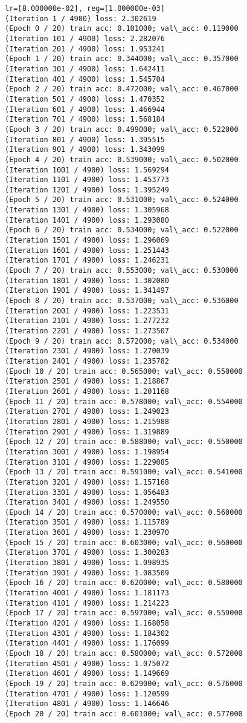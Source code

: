 \documentclass[11pt]{article}
\begin{document}
\begin{Verbatim}[commandchars=\\\{\}]
lr=[8.000000e-02], reg=[1.000000e-03]
(Iteration 1 / 4900) loss: 2.302619
(Epoch 0 / 20) train acc: 0.101000; val\_acc: 0.119000
(Iteration 101 / 4900) loss: 2.282076
(Iteration 201 / 4900) loss: 1.953241
(Epoch 1 / 20) train acc: 0.344000; val\_acc: 0.357000
(Iteration 301 / 4900) loss: 1.642411
(Iteration 401 / 4900) loss: 1.545704
(Epoch 2 / 20) train acc: 0.472000; val\_acc: 0.467000
(Iteration 501 / 4900) loss: 1.470352
(Iteration 601 / 4900) loss: 1.466944
(Iteration 701 / 4900) loss: 1.568184
(Epoch 3 / 20) train acc: 0.499000; val\_acc: 0.522000
(Iteration 801 / 4900) loss: 1.395515
(Iteration 901 / 4900) loss: 1.343099
(Epoch 4 / 20) train acc: 0.539000; val\_acc: 0.502000
(Iteration 1001 / 4900) loss: 1.569294
(Iteration 1101 / 4900) loss: 1.453773
(Iteration 1201 / 4900) loss: 1.395249
(Epoch 5 / 20) train acc: 0.531000; val\_acc: 0.524000
(Iteration 1301 / 4900) loss: 1.305968
(Iteration 1401 / 4900) loss: 1.293080
(Epoch 6 / 20) train acc: 0.534000; val\_acc: 0.522000
(Iteration 1501 / 4900) loss: 1.296069
(Iteration 1601 / 4900) loss: 1.251443
(Iteration 1701 / 4900) loss: 1.246231
(Epoch 7 / 20) train acc: 0.553000; val\_acc: 0.530000
(Iteration 1801 / 4900) loss: 1.302080
(Iteration 1901 / 4900) loss: 1.341497
(Epoch 8 / 20) train acc: 0.537000; val\_acc: 0.536000
(Iteration 2001 / 4900) loss: 1.223531
(Iteration 2101 / 4900) loss: 1.277232
(Iteration 2201 / 4900) loss: 1.273507
(Epoch 9 / 20) train acc: 0.572000; val\_acc: 0.534000
(Iteration 2301 / 4900) loss: 1.270039
(Iteration 2401 / 4900) loss: 1.235782
(Epoch 10 / 20) train acc: 0.565000; val\_acc: 0.550000
(Iteration 2501 / 4900) loss: 1.218867
(Iteration 2601 / 4900) loss: 1.201168
(Epoch 11 / 20) train acc: 0.578000; val\_acc: 0.554000
(Iteration 2701 / 4900) loss: 1.249023
(Iteration 2801 / 4900) loss: 1.215988
(Iteration 2901 / 4900) loss: 1.319889
(Epoch 12 / 20) train acc: 0.588000; val\_acc: 0.550000
(Iteration 3001 / 4900) loss: 1.198954
(Iteration 3101 / 4900) loss: 1.229085
(Epoch 13 / 20) train acc: 0.591000; val\_acc: 0.541000
(Iteration 3201 / 4900) loss: 1.157168
(Iteration 3301 / 4900) loss: 1.056483
(Iteration 3401 / 4900) loss: 1.249550
(Epoch 14 / 20) train acc: 0.570000; val\_acc: 0.560000
(Iteration 3501 / 4900) loss: 1.115789
(Iteration 3601 / 4900) loss: 1.230970
(Epoch 15 / 20) train acc: 0.603000; val\_acc: 0.560000
(Iteration 3701 / 4900) loss: 1.300283
(Iteration 3801 / 4900) loss: 1.098935
(Iteration 3901 / 4900) loss: 1.083509
(Epoch 16 / 20) train acc: 0.620000; val\_acc: 0.580000
(Iteration 4001 / 4900) loss: 1.181173
(Iteration 4101 / 4900) loss: 1.214223
(Epoch 17 / 20) train acc: 0.597000; val\_acc: 0.559000
(Iteration 4201 / 4900) loss: 1.168058
(Iteration 4301 / 4900) loss: 1.184302
(Iteration 4401 / 4900) loss: 1.176099
(Epoch 18 / 20) train acc: 0.580000; val\_acc: 0.572000
(Iteration 4501 / 4900) loss: 1.075072
(Iteration 4601 / 4900) loss: 1.149669
(Epoch 19 / 20) train acc: 0.629000; val\_acc: 0.576000
(Iteration 4701 / 4900) loss: 1.120599
(Iteration 4801 / 4900) loss: 1.146646
(Epoch 20 / 20) train acc: 0.601000; val\_acc: 0.577000


\end{Verbatim}
\end{document}

